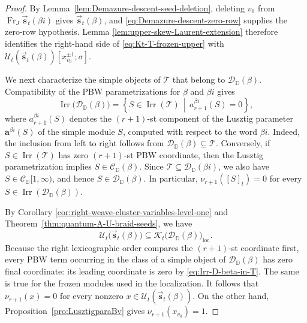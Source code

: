 \documentclass[12pt, reqno]{amsart}
\theoremstyle{plain}
\theoremstyle{definition}
\numberwithin{equation}{section}
\newcommand{\DD}{\mathbb{D}}
\begin{document}
\begin{proof}
By Lemma~\ref{lem:Demazure-descent-seed-deletion}, deleting \(v_0\)
from
\(\operatorname{Fr}_{J}
\overrightarrow{\mathbf s}_t(\beta i)\)
gives \(\overrightarrow{\mathbf s}_t(\beta)\), and
\eqref{eq:Demazure-descent-zero-row} supplies the zero-row hypothesis.
Lemma
\ref{lem:upper-skew-Laurent-extension} therefore identifies the
right-hand side of \eqref{eq:Kt-T-frozen-upper} with
\(\mathcal U_t(\overrightarrow{\mathbf s}_t(\beta))
[x_{v_0}^{\pm1};\sigma]\).

We next characterize the simple objects of \(\mathscr T\) that
belong to \(\mathscr D_{\DD}(\beta)\). Compatibility of the PBW
parametrizations for \(\beta\) and \(\beta i\) gives
\begin{equation}\label{eq:Irr-D-beta-in-T}
    \operatorname{Irr}\bigl(
        \mathscr D_{\DD}(\beta)
    \bigr)
    =
    \left\{
        S\in\operatorname{Irr}(\mathscr T)
        \,\middle|\,
        a_{r+1}^{\beta i}(S)=0
    \right\},
\end{equation}
where \(a_{r+1}^{\beta i}(S)\) denotes the \((r+1)\)-st component of the Lusztig parameter \(\mathbf a^{\beta i}(S)\) of the simple module \(S\), computed with respect to the word \(\beta i\).
Indeed, the inclusion from left to right follows from
\(\mathscr D_{\DD}(\beta)\subseteq\mathscr T\). Conversely, if
\(S\in\operatorname{Irr}(\mathscr T)\) has zero
\((r+1)\)-st PBW coordinate, then the Lusztig parametrization implies
\(S\in\mathscr C_\DD(\beta)\). Since
\(\mathscr T\subseteq\mathscr D_{\DD}(\beta i)\), we also have
\(S\in\mathscr C_{\DD}[1,\infty)\), and hence
\(S\in\mathscr D_{\DD}(\beta)\). In particular,
\(\nu_{r+1}([S]_t)=0\) for every
\(S\in\operatorname{Irr}(\mathscr D_{\DD}(\beta))\).

By Corollary
\ref{cor:right-weave-cluster-variables-level-one} and
Theorem~\ref{thm:quantum-A-U-braid-seeds}, we have
\begin{equation}\label{eq:upper-contained-localized-Kt}
    \mathcal U_t\bigl(
        \overrightarrow{\mathbf s}_t(\beta)
    \bigr)
    \subseteq
    \mathcal{K}_t\bigl(
        \mathscr D_{\DD}(\beta)
    \bigr)_{\mathrm{loc}}.
\end{equation}
Because the right lexicographic order compares the
\((r+1)\)-st coordinate first, every PBW term occurring in the class
of a simple object of \(\mathscr D_{\DD}(\beta)\) has zero final
coordinate: its leading coordinate is zero by
\eqref{eq:Irr-D-beta-in-T}.
The same is true for the frozen modules used in the
localization. It follows that
\(\nu_{r+1}(x)=0\) for every nonzero
\(x\in\mathcal U_t(\overrightarrow{\mathbf s}_t(\beta))\).
On the other hand, Proposition~\ref{pro:LusztigparaBv} gives
\(\nu_{r+1}(x_{v_0})=1\).


\end{proof}
\end{document}
